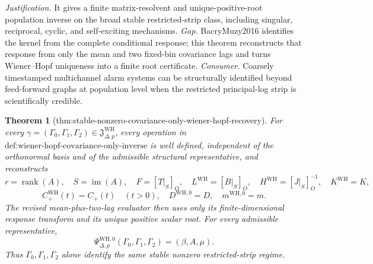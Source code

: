 \documentclass{article}
\newtheorem{theorem}{Theorem}
\begin{document}
\par\smallskip\noindent \textit{Justification.} It gives a finite matrix-resolvent and unique-positive-root population inverse on the broad stable restricted-strip class, including singular, reciprocal, cyclic, and self-exciting mechanisms. \textit{Gap.} BacryMuzy2016 identifies the kernel from the complete conditional response; this theorem reconstructs that response from only the mean and two fixed-bin covariance lags and turns Wiener--Hopf uniqueness into a finite root certificate. \textit{Consumer.} Coarsely timestamped multichannel alarm systems can be structurally identified beyond feed-forward graphs at population level when the restricted principal-log strip is scientifically credible.

\begin{theorem}[thm:stable-nonzero-covariance-only-wiener-hopf-recovery]\label{thm:stable-nonzero-covariance-only-wiener-hopf-recovery}
For every \(\gamma=(\Gamma_0,\Gamma_1,\Gamma_2)\in\mathfrak J_{\Delta,p}^{\mathrm{WH}}\), every operation in \(\text{def:wiener-hopf-covariance-only-inverse}\) is well defined, independent of the orthonormal basis and of the admissible structural representative, and reconstructs
\[
 r=\operatorname{rank}(A),\quad S=\operatorname{im}(A),\quad
 F=[T|_S]_O,\quad L^{\mathrm{WH}}=[B|_S]_O,\quad
 H^{\mathrm{WH}}=[J|_S]_O^{-1},\quad K^{\mathrm{WH}}=K,
\]
\[
 C_{+}^{\mathrm{WH}}(t)=C_{+}(t)\quad(t>0),\quad
 D^{\mathrm{WH},0}=D,\quad
 m^{\mathrm{WH},0}=m.
\]
The revised mean-plus-two-lag evaluator then uses only its finite-dimensional response transform and its unique positive scalar root.  For every admissible representative,
\[
 \Psi_{\Delta,p}^{\mathrm{WH},0}(\Gamma_0,\Gamma_1,\Gamma_2)
 =(\beta,A,\mu).
\]
Thus \(\Gamma_0,\Gamma_1,\Gamma_2\) alone identify the same stable nonzero restricted-strip regime.
\end{theorem}
\end{document}
